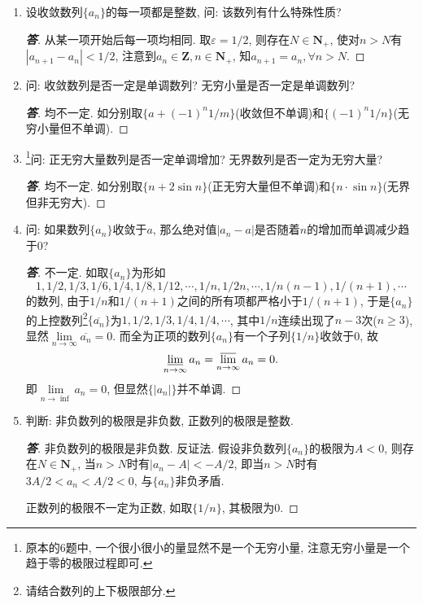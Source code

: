 \documentclass[a4paper,11pt,twoside]{ctexbook}
\begin{document}
\begin{enumerate}
\begin{proof}[\bf 答]
		      $\lim\limits_{n\to\infty} a_{n+1}/a_n=1$. 举一反例$\{(-1)^n 1/n\}$, 显然$\lim\limits_{n\to\infty} (-1)^n 1/n=0$, 但
		      \[
			      \lim\limits_{n\to\infty}\dfrac{(-1)^{n+1} 1/(n+1)}{(-1)^n 1/n}=\lim\limits_{n\to\infty} -1\cdot\dfrac{n}{n+1}=-1.\qedhere
		      \]
	      \end{proof}
	\item 设收敛数列$\{a_n\}$的每一项都是整数, 问: 该数列有什么特殊性质?
	      \begin{proof}[\bf 答]
		      从某一项开始后每一项均相同. 取$\varepsilon=1/2$, 则存在$N\in\mathbf{N}_{+}$, 使对$n>N$有$|a_{n+1}-a_n|<1/2$, 注意到$a_n\in\mathbf{Z}, n\in\mathbf{N}_{+}$, 知$a_{n+1}=a_n, \forall n>N$.\qedhere
	      \end{proof}
	\item 问: 收敛数列是否一定是单调数列? 无穷小量是否一定是单调数列?
	      \begin{proof}[\bf 答]
		      均不一定. 如分别取$\{a+(-1)^n 1/m\}$(收敛但不单调)和$\{(-1)^n 1/n\}$(无穷小量但不单调). \qedhere
	      \end{proof}
	\item \footnote{原本的6题中, 一个很小很小的量显然不是一个无穷小量, 注意无穷小量是一个趋于零的极限过程即可.}问: 正无穷大量数列是否一定单调增加? 无界数列是否一定为无穷大量?
	      \begin{proof}[\bf 答]
		      均不一定. 如分别取$\{n+2\sin{n}\}$(正无穷大量但不单调)和$\{n\cdot\sin{n}\}$(无界但非无穷大). \qedhere
	      \end{proof}
	\item 问: 如果数列$\{a_n\}$收敛于$a$, 那么绝对值$|a_n-a|$是否随着$n$的增加而单调减少趋于$0$?
	      \begin{proof}[\bf 答]
		      不一定. 如取$\{a_n\}$为形如
		      \[
			      1,1/2,1/3,1/6,1/4,1/8,1/12,\cdots,1/n,1/2n,\cdots,1/n(n-1),1/(n+1),\cdots
		      \]
		      的数列, 由于$1/n$和$1/(n+1)$之间的所有项都严格小于$1/(n+1)$, 于是$\{a_n\}$的上控数列\footnote{请结合数列的上下极限部分.}$\{\overline{a_n}\}$为$1,1/2,1/3,1/4,1/4,\cdots$, 其中$1/n$连续出现了$n-3$次($n\geqslant3$), 显然$\lim\limits_{n\to\infty}\overline{a_n}=0$. 而全为正项的数列$\{a_n\}$有一个子列$\{1/n\}$收敛于$0$, 故
		      \[
			      \varliminf\limits_{n\to\infty} a_n=\varlimsup\limits_{n\to\infty} a_n=0.
		      \]
		      即$\lim\limits_{n\to\inf}a_n=0$, 但显然$\{|a_n|\}$并不单调.\qedhere
	      \end{proof}
	\item 判断: 非负数列的极限是非负数, 正数列的极限是整数.
	      \begin{proof}[\bf 答]
		      非负数列的极限是非负数. 反证法. 假设非负数列$\{a_n\}$的极限为$A<0$, 则存在$N\in\mathbf{N}_{+}$, 当$n>N$时有$|a_n-A|<-A/2$, 即当$n>N$时有$3A/2<a_n<A/2<0$, 与$\{a_n\}$非负矛盾.

		      正数列的极限不一定为正数, 如取$\{1/n\}$, 其极限为$0$.\qedhere
	      \end{proof}
\end{enumerate}
\end{document}
